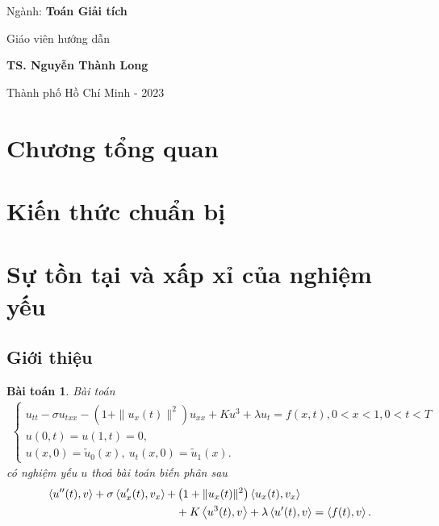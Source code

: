 \documentclass[12pt,a4paper]{article}
\newtheorem{theorem}{Bài toán}[section]
\theoremstyle{definition}
\begin{document}
\begin{center}
    {\fontsize{13}{1}\selectfont \qquad Ngành: \textbf{Toán Giải tích}} 
\end{center}
 


\vspace*{2.5cm}

\begin{center}
    {\fontsize{13}{1}\selectfont \qquad Giáo viên hướng dẫn}

    {\fontsize{13}{1}\selectfont \qquad \textbf{TS. Nguyễn Thành Long}}
\end{center}
 


\vfill

\begin{center}
{\fontsize{12}{1}\selectfont  Thành phố Hồ Chí Minh - 2023}
\end{center}
 

\vspace*{0.5cm}

\newpage
\tableofcontents
\newpage

\section{Chương tổng quan}
\section{Kiến thức chuẩn bị}
\section{Sự tồn tại và xấp xỉ của nghiệm yếu}

\subsection{Giới thiệu}

\begin{theorem}
Bài toán
\begin{align} \label{maineqn}
    \begin{cases}
        u_{tt} - \sigma u_{txx} - \left(1 + \|u_x(t)\|^2\right) u_{xx} + Ku^3 + \lambda u_t = f(x,t), 0 < x < 1, 0 < t < T \\
        u(0,t) = u(1,t) = 0, \\
        u(x,0) = \tilde{u}_0(x),\ u_t(x,0) = \tilde{u}_1(x).
    \end{cases}
\end{align}
có nghiệm yếu $u$ thoả bài toán biến phân sau
\begin{align}
    \left< u''(t), v \right> + \sigma \left< u'_x(t), v_x \right> + &\left(1 + \|u_x(t)\|^2\right) \left< u_x(t), v_x \right> \\
    &+ K \left< u^3(t), v \right> + \lambda \left< u'(t), v \right> = \left< f(t), v \right>. \notag
\end{align}
\end{theorem}
\end{document}
